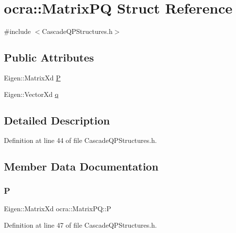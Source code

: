 \hypertarget{structocra_1_1MatrixPQ}{}\section{ocra\+:\+:Matrix\+PQ Struct Reference}
\label{structocra_1_1MatrixPQ}


{\ttfamily \#include $<$Cascade\+Q\+P\+Structures.\+h$>$}

\subsection*{Public Attributes}
\begin{DoxyCompactItemize}
\item 
Eigen\+::\+Matrix\+Xd \hyperlink{structocra_1_1MatrixPQ_ae37e780774f14b1097de106d1480cee4}{P}
\item 
Eigen\+::\+Vector\+Xd \hyperlink{structocra_1_1MatrixPQ_a5b735797657100582565c6337fb090e1}{q}
\end{DoxyCompactItemize}


\subsection{Detailed Description}


Definition at line 44 of file Cascade\+Q\+P\+Structures.\+h.



\subsection{Member Data Documentation}
\hypertarget{structocra_1_1MatrixPQ_ae37e780774f14b1097de106d1480cee4}{}\label{structocra_1_1MatrixPQ_ae37e780774f14b1097de106d1480cee4} 
\subsubsection{\texorpdfstring{P}{P}}
{\footnotesize\ttfamily Eigen\+::\+Matrix\+Xd ocra\+::\+Matrix\+P\+Q\+::P}



Definition at line 47 of file Cascade\+Q\+P\+Structures.\+h.

\hypertarget{structocra_1_1MatrixPQ_a5b735797657100582565c6337fb090e1}{}\label{structocra_1_1MatrixPQ_a5b735797657100582565c6337fb090e1} 
